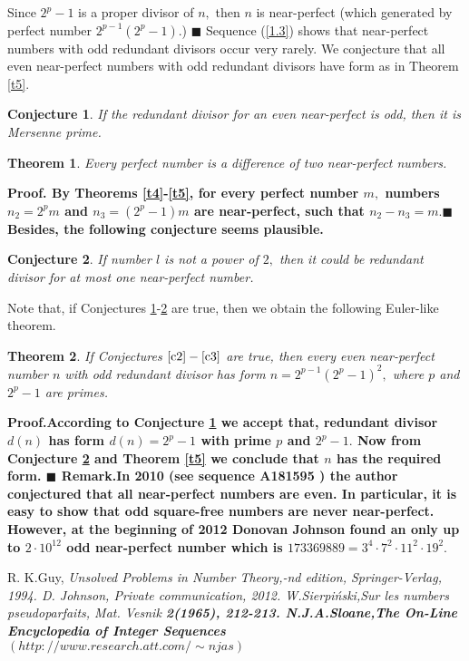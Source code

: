 \documentclass[12pt]{amsart}
\newtheorem{theorem}{Theorem}
\newtheorem{conjecture}{Conjecture}
\numberwithin{equation}{section}
\begin{document}
Since $2^p-1$ is a proper divisor of $n,$ then $n$ is near-perfect (which generated by perfect number $2^{p-1}(2^p-1).$) $\blacksquare$ \newline
\indent Sequence (\ref{1.3}) shows that near-perfect numbers with odd redundant divisors occur very rarely. We conjecture that all even near-perfect numbers with odd redundant divisors have form as in Theorem \ref{t5}.\newpage
\begin{conjecture} \label{c2}
 If the redundant divisor for an even near-perfect is odd, then it is Mersenne prime.
\end{conjecture}
\begin{theorem} \label{t6}
Every perfect number is a difference of two near-perfect numbers.
\end{theorem}
\bfseries Proof. \mdseries
By Theorems \ref{t4}-\ref{t5}, for every perfect number $m,$ numbers $n_2=2^pm$ and $n_3=(2^p-1)m$ are near-perfect, such that $n_2-n_3=m. \blacksquare$\newline
Besides, the following conjecture seems plausible.
\begin{conjecture} \label{c3}
 If number $l$ is not a power of $2,$ then it could be redundant divisor for at most one near-perfect number.
\end{conjecture}
\indent Note that, if Conjectures \ref{c2}-\ref{c3} are true, then we obtain the following Euler-like theorem.
\begin{theorem} \label{t7}
If Conjectures $\ref{c2}-\ref{c3}$ are true, then every even near-perfect number $n$ with odd redundant divisor has form $n=2^{p-1}(2^p-1)^2,$ where $p$ and $2^p-1$ are primes.
\end{theorem}
\bfseries Proof.\mdseries\enskip According to Conjecture \ref{c2} we accept that, redundant divisor $d(n)$ has form $d(n)=2^p-1$
with prime $p$ and $2^p-1.$ Now from Conjecture \ref{c3} and Theorem \ref{t5} we conclude that $n$ has the required form. $\blacksquare$ \newline
\bfseries Remark.\mdseries \enskip In 2010 (see sequence A181595 \cite{4}) the author conjectured that all near-perfect numbers are even. In particular, it is easy to show that odd square-free numbers are never near-perfect. However, at the beginning of 2012 Donovan Johnson \cite{2} found an only up to $2\cdot10^{12}$ odd near-perfect number which is $173369889=3^4\cdot7^2\cdot11^2\cdot19^2.$




\begin{thebibliography}{3}
  R. \enskip K.\enskip Guy, \slshape Unsolved Problems in Number Theory,\upshape {}-nd edition, Springer-Verlag, 1994.
  D. \enskip Johnson, Private communication, 2012.
  W.\enskip Sierpi\'{n}ski,\enskip Sur les numbers pseudoparfaits, Mat. Vesnik \bfseries 2\mdseries \enskip(1965), 212-213.
  N.\enskip J.\enskip A.\enskip Sloane,\enskip\slshape The On-Line Encyclopedia of Integer Sequences \upshape $(http: //www.research.att.com/\sim njas)$
\end{thebibliography}
\;\;\;\;\;\;\;\;
\end{document}

